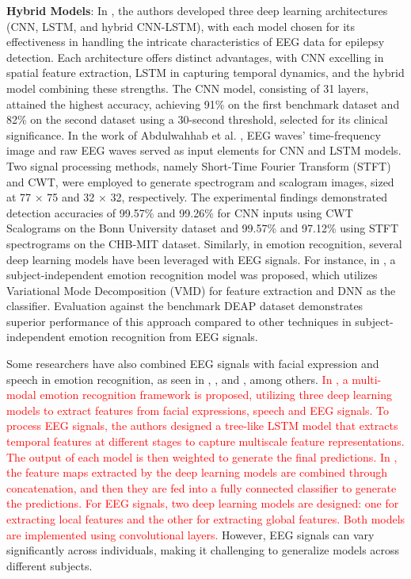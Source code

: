 \documentclass[preprint,12pt]{elsarticle}
\begin{document}
\textbf{Hybrid Models}: In \citep{hermawan_multi_2024}, the authors developed three deep learning architectures (CNN, LSTM, and hybrid CNN-LSTM), with each model chosen for its effectiveness in handling the intricate characteristics of EEG data for epilepsy detection. Each architecture offers distinct advantages, with CNN excelling in spatial feature extraction, LSTM in capturing temporal dynamics, and the hybrid model combining these strengths. The CNN model, consisting of 31 layers, attained the highest accuracy, achieving 91\% on the first benchmark dataset and 82\% on the second dataset using a 30-second threshold, selected for its clinical significance. In the work of Abdulwahhab et al. \citep{abdulwahhab_detection_2024}, EEG waves' time-frequency image and raw EEG waves served as input elements for CNN and LSTM models. Two signal processing methods, namely Short-Time Fourier Transform (STFT) and CWT, were employed to generate spectrogram and scalogram images, sized at 77 × 75 and 32 × 32, respectively. The experimental findings demonstrated detection accuracies of 99.57\% and 99.26\% for CNN inputs using CWT Scalograms on the Bonn University dataset and 99.57\% and 97.12\% using STFT spectrograms on the CHB-MIT dataset. Similarly, in emotion recognition, several deep learning models have been leveraged with EEG signals. For instance, in \citep{pandey_subject_2022},  a subject-independent emotion recognition model was proposed, which utilizes Variational Mode Decomposition (VMD) for feature extraction and DNN as the classifier. Evaluation against the benchmark DEAP dataset demonstrates superior performance of this approach compared to other techniques in subject-independent emotion recognition from EEG signals. 

Some researchers have also combined EEG signals with facial expression and speech in emotion recognition, as seen in \citep{hassouneh_development_2020}, \citep{pan_multimodal_2024}, and \citep{wang_multimodal_2023}, among others. \textcolor{red}{In \citep{pan_multimodal_2024}, a multi-modal emotion recognition framework is proposed, utilizing three deep learning models to extract features from facial expressions, speech and EEG signals. To process EEG signals, the authors designed a tree-like LSTM model that extracts temporal features at different stages to capture multiscale feature representations. The output of each model is then weighted to generate the final predictions. In \citep{wang_multimodal_2023}, the feature maps extracted by the deep learning models are combined through concatenation, and then they are fed into a fully connected classifier to generate the predictions. For EEG signals, two deep learning models are designed: one for extracting local features and the other for extracting global features. Both models are implemented using convolutional layers.} However, EEG signals can vary significantly across individuals, making it challenging to generalize models across different subjects.
\end{document}
